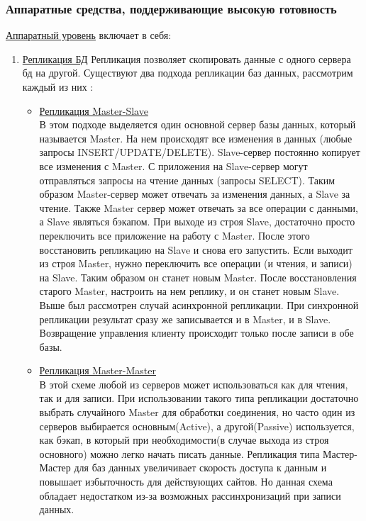 \subsubsection{Аппаратные средства, поддерживающие высокую готовность}
\underline{Аппаратный уровень} включает в себя:
\begin{enumerate}
    \item \underline{Репликация БД}
    Репликация позволяет скопировать данные с одного сервера бд на другой.
    Существуют  два подхода репликации баз данных, рассмотрим каждый из них \autocite{Gregorchenko}:
    \begin{itemize}
        \item \underline{Репликация Master-Slave} \\В этом подходе выделяется один основной сервер базы данных, который называется Master. На нем происходят все изменения в данных (любые запросы INSERT/UPDATE/DELETE). Slave-сервер постоянно копирует все изменения с Master. С приложения на Slave-сервер могут отправляться запросы на чтение данных (запросы SELECT). Таким образом Master-сервер может отвечать за изменения данных, а Slave за чтение. Также Master сервер может отвечать за все операции с данными, а Slave являться бэкапом. При выходе из строя Slave, достаточно просто переключить все приложение на работу с Master. После этого восстановить репликацию на Slave и снова его запустить. Если выходит из строя Master, нужно переключить все операции (и чтения, и записи) на Slave. Таким образом он станет новым Master. После восстановления старого Master, настроить на нем реплику, и он станет новым Slave.
        Выше был рассмотрен случай асинхронной репликации. При синхронной репликации результат сразу же записывается и в Master, и в Slave. Возвращение управления клиенту происходит только после записи в обе базы.
        \item \underline{Репликация Master-Master}\\ В этой схеме любой из серверов может использоваться как для чтения, так и для записи. При использовании такого типа репликации достаточно выбрать случайного Master для обработки соединения, но часто один из серверов выбирается основным(Active), а другой(Passive) используется, как бэкап, в который при необходимости(в случае выхода из строя основного) можно легко начать писать данные. Репликация типа Мастер-Мастер для баз данных увеличивает скорость доступа к данным и повышает избыточность для действующих сайтов. Но данная схема обладает недостатком из-за возможных рассинхронизаций при записи данных. 
    \end{itemize}  


\end{enumerate}
